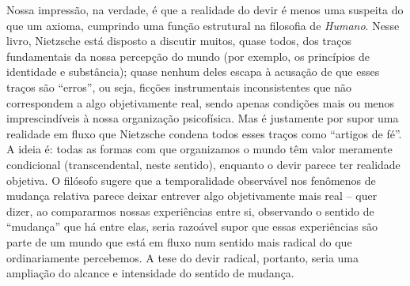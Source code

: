 \documentclass[
	12pt,				%
	openright,			%
	oneside,			%
	a4paper,			%
	english,			%
	french,				%
	spanish,			%
	brazil				%
	]{abntex2}
\begin{document}
Nossa impressão, na verdade, é que a realidade do devir é menos uma suspeita do que um axioma, cumprindo uma função estrutural na filosofia de \textit{Humano}. Nesse livro, Nietzsche está disposto a discutir muitos, quase todos, dos traços fundamentais da nossa percepção do mundo (por exemplo, os princípios de identidade e substância); quase nenhum deles escapa à acusação de que esses traços são “erros”, ou seja, ficções instrumentais inconsistentes que não correspondem a algo objetivamente real, sendo apenas condições mais ou menos imprescindíveis à nossa organização psicofísica. Mas é justamente por supor uma realidade em fluxo que Nietzsche condena todos esses traços como “artigos de fé”. A ideia é: todas as formas com que organizamos o mundo têm valor meramente condicional (transcendental, neste sentido), enquanto o devir parece ter realidade objetiva. O filósofo sugere que a temporalidade observável nos fenômenos de mudança relativa parece deixar entrever algo objetivamente mais real – quer dizer, ao compararmos nossas experiências entre si, observando o sentido de “mudança” que há entre elas, seria razoável supor que essas experiências são parte de um mundo que está em fluxo num sentido mais radical do que ordinariamente percebemos. A tese do devir radical, portanto, seria uma ampliação do alcance e intensidade do sentido de mudança.
\end{document}
